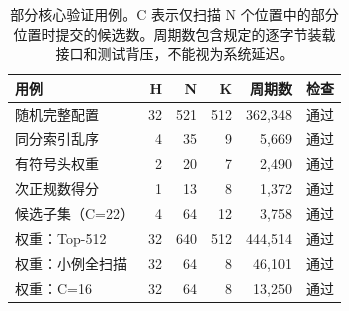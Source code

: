 \begin{table}[t]
\centering\caption{部分核心验证用例。C 表示仅扫描 N 个位置中的部分位置时提交的候选数。周期数包含规定的逐字节装载接口和测试背压，不能视为系统延迟。}
\label{tab:core}
\small
\begin{tabular}{lrrrrl}\toprule
用例 & H & N & K & 周期数 & 检查\\\midrule
随机完整配置 & 32 & 521 & 512 & 362,348 & 通过\\
同分索引乱序 & 4 & 35 & 9 & 5,669 & 通过\\
有符号头权重 & 2 & 20 & 7 & 2,490 & 通过\\
次正规数得分 & 1 & 13 & 8 & 1,372 & 通过\\
候选子集（C=22） & 4 & 64 & 12 & 3,758 & 通过\\
权重：Top-512 & 32 & 640 & 512 & 444,514 & 通过\\
权重：小例全扫描 & 32 & 64 & 8 & 46,101 & 通过\\
权重：C=16 & 32 & 64 & 8 & 13,250 & 通过\\
\bottomrule\end{tabular}
\end{table}
